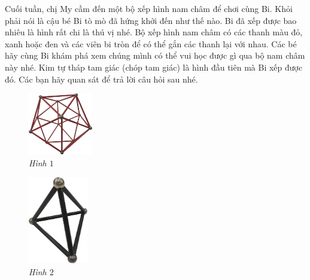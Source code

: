 	\begin{multicols}{2}
		Cuối tuần, chị My cầm đến một bộ xếp hình nam châm để chơi cùng Bi. Khỏi phải nói là cậu bé Bi tò mò đã hứng khởi đến như thế nào. Bi đã xếp được bao nhiêu là hình rất chi là thú vị nhé.
		\vskip 0.1cm
		Bộ xếp hình nam châm có các thanh màu đỏ,  xanh hoặc đen và các viên bi tròn để có thể gắn các thanh lại với nhau.
		\vskip 0.1cm
		Các bé hãy cùng Bi khám phá xem chúng mình có thể vui học được gì qua bộ nam châm này nhé.
		\vskip 0.1cm
		Kim tự tháp tam giác (chóp tam giác) là hình đầu tiên mà Bi xếp được đó. Các bạn hãy quan sát để trả lời câu hỏi sau nhé.
		\begin{figure}[H]
			\centering
			\vspace*{-5pt}
			\captionsetup{labelformat= empty, justification=centering}
			\includegraphics[width=0.25\textwidth]{1}
			\caption{\small\textit{Hình $1$}}
			\vspace*{-10pt}
		\end{figure}
		\begin{figure}[H]
			\centering
			\captionsetup{labelformat= empty, justification=centering}
			\includegraphics[width=0.23\textwidth]{2}
			\caption{\small\textit{Hình $2$}}
			\vspace*{-5pt}
		\end{figure}
	\end{multicols}
	

